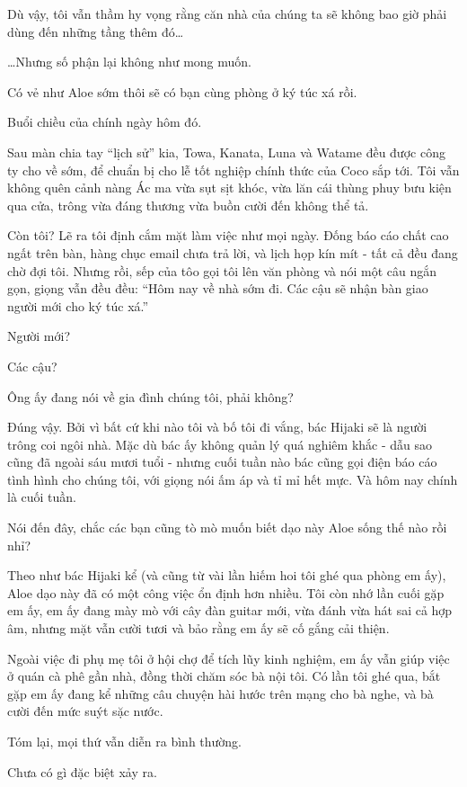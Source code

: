 \documentclass[../main.tex]{subfiles}
\begin{document}
Dù vậy, tôi vẫn thầm hy vọng rằng căn nhà của chúng ta sẽ không bao giờ phải dùng đến những tầng thêm đó\dots

\dots Nhưng số phận lại không như mong muốn.

Có vẻ như Aloe sớm thôi sẽ có bạn cùng phòng ở ký túc xá rồi.

\il

Buổi chiều của chính ngày hôm đó.

Sau màn chia tay ``lịch sử'' kia, Towa, Kanata, Luna và Watame đều được công ty cho về sớm, để chuẩn bị cho lễ tốt nghiệp chính thức của Coco sắp tới. Tôi vẫn không quên cảnh nàng Ác ma vừa sụt sịt khóc, vừa lăn cái thùng phuy bưu kiện qua cửa, trông vừa đáng thương vừa buồn cười đến không thể tả.

Còn tôi? Lẽ ra tôi định cắm mặt làm việc như mọi ngày. Đống báo cáo chất cao ngất trên bàn, hàng chục email chưa trả lời, và lịch họp kín mít - tất cả đều đang chờ đợi tôi. Nhưng rồi, sếp của tôo gọi tôi lên văn phòng và nói một câu ngắn gọn, giọng vẫn đều đều: ``Hôm nay về nhà sớm đi. Các cậu sẽ nhận bàn giao người mới cho ký túc xá.''

Người mới?

Các cậu?

Ông ấy đang nói về gia đình chúng tôi, phải không?

Đúng vậy. Bởi vì bất cứ khi nào tôi và bố tôi đi vắng, bác Hijaki sẽ là người trông coi ngôi nhà. Mặc dù bác ấy không quản lý quá nghiêm khắc - dẫu sao cũng đã ngoài sáu mươi tuổi - nhưng cuối tuần nào bác cũng gọi điện báo cáo tình hình cho chúng tôi, với giọng nói ấm áp và tỉ mỉ hết mực. Và hôm nay chính là cuối tuần.

Nói đến đây, chắc các bạn cũng tò mò muốn biết dạo này Aloe sống thế nào rồi nhỉ?

Theo như bác Hijaki kể (và cũng từ vài lần hiếm hoi tôi ghé qua phòng em ấy), Aloe dạo này đã có một công việc ổn định hơn nhiều. Tôi còn nhớ lần cuối gặp em ấy, em ấy đang mày mò với cây đàn guitar mới, vừa đánh vừa hát sai cả hợp âm, nhưng mặt vẫn cười tươi và bảo rằng em ấy sẽ cố gắng cải thiện.

Ngoài việc đi phụ mẹ tôi ở hội chợ để tích lũy kinh nghiệm, em ấy vẫn giúp việc ở quán cà phê gần nhà, đồng thời chăm sóc bà nội tôi. Có lần tôi ghé qua, bắt gặp em ấy đang kể những câu chuyện hài hước trên mạng cho bà nghe, và bà cười đến mức suýt sặc nước.

Tóm lại, mọi thứ vẫn diễn ra bình thường.

Chưa có gì đặc biệt xảy ra.
\end{document}

